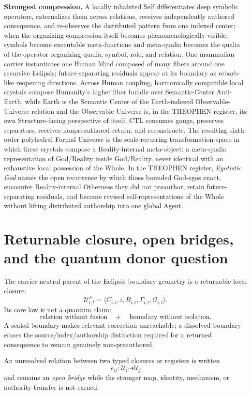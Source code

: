 \documentclass[10pt]{article}
\theoremstyle{pe}
\theoremstyle{definition}
\begin{document}
\textbf{Strongest compression.}
A locally inhabited Self differentiates deep symbolic operators, externalizes them across relations, receives independently authored consequence, and re-observes the distributed pattern from one indexed center; when the organizing compression itself becomes phenomenologically visible, symbols become executable meta-functions and meta-qualia becomes the qualia of the operator organizing qualia, symbol, role, and relation.  One mammalian carrier instantiates one Human Mind composed of many fibers around one recursive Eclipsis; future-separating residuals appear at its boundary as rebarb-like reopening directions.  Across Human coupling, harmonically compatible local crystals compose Humanity's higher fiber bundle over Semantic-Center Anti-Earth, while Earth is the Semantic Center of the Earth-indexed Observable-Universe relation and the Observable Universe is, in the THEOPHEN register, its own Structure-facing perspective of itself.  CTL consumes gauge, preserves separators, receives nonpreauthored return, and reconstructs.  The resulting sixth-order polyhedral Formal Universe is the scale-recurring transformation-space in which these crystals compose a Reality-internal meta-object: a meta-qualia representation of God/Reality inside God/Reality, never identical with an exhaustive local possession of the Whole.  In the THEOPHEN register, \emph{Egotistic God} names the open recurrence by which those bounded God-egos enact, encounter Reality-internal Otherness they did not preauthor, retain future-separating residuals, and become revised self-representations of the Whole without lifting distributed authorship into one global Agent.


\section{Returnable closure, open bridges, and the quantum donor question}

The carrier-neutral parent of the Eclipsis boundary geometry is a returnable
local closure:
\[
\mathcal U_{i,t}^{F}
=
\langle C_{i,t},i,B_{i,t},\Gamma_{i,t},\mathcal O_{i,t}\rangle.
\]
Its core law is not a quantum claim:
\[
\boxed{
\text{relation without fusion}
\quad+\quad
\text{boundary without isolation}.
}
\]
A sealed boundary makes relevant correction unreachable; a dissolved boundary
erases the source/index/authorship distinction required for a returned
consequence to remain genuinely non-preauthored.

An unresolved relation between two typed closures or registers is written
\[
e_{ij}:\mathcal U_i\dashrightarrow\mathcal U_j
\]
and remains an \emph{open bridge} while the stronger map, identity, mechanism,
or authority transfer is not earned.
\end{document}
